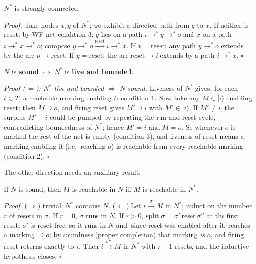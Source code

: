 \begin{proposition}
$N^*$ is strongly connected.
\end{proposition}

\textit{Proof.} Take nodes $x, y$ of $N^*$; we exhibit a directed path from $y$ to $x$. If neither is reset: by WF-net condition 3, $y$ lies on a path $i \to^\ast y \to^\ast o$ and $x$ on a path $i \to^\ast x \to^\ast o$; compose $y \to^\ast o \xrightarrow{\text{reset}} i \to^\ast x$. If $x = \text{reset}$: any path $y \to^\ast o$ extends by the arc $o \to \text{reset}$. If $y = \text{reset}$: the arc $\text{reset} \to i$ extends by a path $i \to^\ast x$. \hfill$\square$

\begin{theorem}
$N$ is \textbf{sound} $\iff$ $N^*$ is \textbf{live and bounded}.
\end{theorem}

\textit{Proof ($\Leftarrow$): $N^*$ live and bounded $\Rightarrow$ $N$ sound.} Liveness of $N^*$ gives, for each $t \in T$, a reachable marking enabling $t$: condition 1. Now take any $M \in [i\rangle$ enabling reset; then $M \supseteq o$, and firing reset gives $M' \supseteq i$ with $M' \in [i\rangle$. If $M' \neq i$, the surplus $M' - i$ could be pumped by repeating the run-and-reset cycle, contradicting boundedness of $N^*$; hence $M' = i$ and $M = o$. So whenever $o$ is marked the rest of the net is empty (condition 3), and liveness of reset means a marking enabling it (i.e.\ reaching $o$) is reachable from every reachable marking (condition 2). \hfill$\square$

The other direction needs an auxiliary result.

\begin{lemma}
If $N$ is sound, then $M$ is reachable in $N$ iff $M$ is reachable in $N^*$.
\end{lemma}

\textit{Proof.} ($\Rightarrow$) trivial: $N^*$ contains $N$. ($\Leftarrow$) Let $i \xrightarrow{\sigma} M$ in $N^*$; induct on the number $r$ of resets in $\sigma$. If $r = 0$, $\sigma$ runs in $N$. If $r > 0$, split $\sigma = \sigma'\, \text{reset}\, \sigma''$ at the first reset: $\sigma'$ is reset-free, so it runs in $N$ and, since reset was enabled after it, reaches a marking $\supseteq o$; by soundness (proper completion) that marking \emph{is} $o$, and firing reset returns exactly to $i$. Then $i \xrightarrow{\sigma''} M$ in $N^*$ with $r - 1$ resets, and the inductive hypothesis closes. \hfill$\square$

